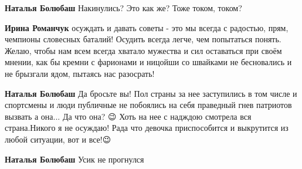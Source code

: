 \begin{itemize}
\begin{itemize}
 
\textbf{Наталья Болюбаш} Накинулись? Это как же? Тоже током, током?\Laughey[1.0][white]

 
\textbf{Ирина Романчук} осуждать и давать советы - это мы всегда с радостью, прям, чемпионы словесных баталий! Осудить всегда легче, чем попытаться понять. Желаю, чтобы нам всем всегда хватало мужества и сил оставаться при своём мнении, как бы кремни с фарионами и ницойши со швайками не бесновались и не брызгали ядом, пытаясь нас разосрать!

 
\textbf{Наталья Болюбаш} Да бросьте вы! Пол страны за нее заступились в том числе и спортсмены и люди публичные не побоялись на себя праведный гнев патриотов вызвать а она... Да что она? 😉 Хоть на нее с надждою смотрела вся страна.\Laughey[1.0][white] Никого я не осуждаю! Рада что девочка приспособится и выкрутится из любой ситуации, вот и все!😉

 
\textbf{Наталья Болюбаш} Усик не прогнулся

\end{itemize}

 

\end{itemize}
